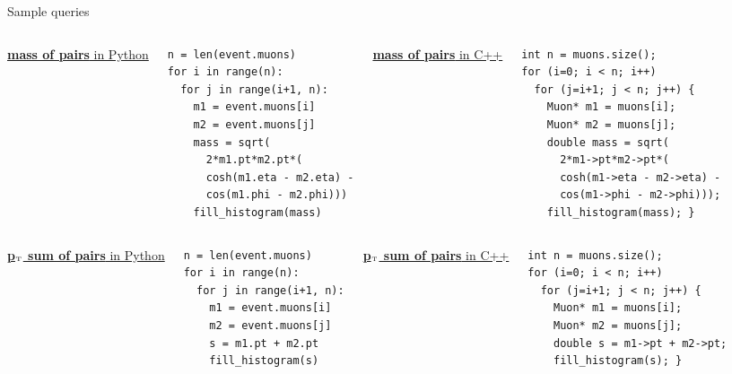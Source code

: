 \documentclass{beamer}
\begin{document}
\begin{frame}[fragile]{Sample queries}
\vspace{0.5 cm}
\scriptsize

\begin{columns}
\underline{{\bf mass of pairs} in Python}
\begin{verbatim}
n = len(event.muons)
for i in range(n):
  for j in range(i+1, n):
    m1 = event.muons[i]
    m2 = event.muons[j]
    mass = sqrt(
      2*m1.pt*m2.pt*(
      cosh(m1.eta - m2.eta) -
      cos(m1.phi - m2.phi)))
    fill_histogram(mass)
\end{verbatim}
\underline{{\bf mass of pairs} in C++}
\begin{verbatim}
int n = muons.size();
for (i=0; i < n; i++)
  for (j=i+1; j < n; j++) {
    Muon* m1 = muons[i];
    Muon* m2 = muons[j];
    double mass = sqrt(
      2*m1->pt*m2->pt*(
      cosh(m1->eta - m2->eta) -
      cos(m1->phi - m2->phi)));
    fill_histogram(mass); }
\end{verbatim}
\end{columns}

\vfill
\begin{columns}
\underline{{\bf p$_{\mbox{\tiny T}}$ sum of pairs} in Python}
\begin{verbatim}
n = len(event.muons)
for i in range(n):
  for j in range(i+1, n):
    m1 = event.muons[i]
    m2 = event.muons[j]
    s = m1.pt + m2.pt
    fill_histogram(s)
\end{verbatim}
\underline{{\bf p$_{\mbox{\tiny T}}$ sum of pairs} in C++}
\begin{verbatim}
int n = muons.size();
for (i=0; i < n; i++)
  for (j=i+1; j < n; j++) {
    Muon* m1 = muons[i];
    Muon* m2 = muons[j];
    double s = m1->pt + m2->pt;
    fill_histogram(s); }
\end{verbatim}
\end{columns}
\end{frame}




\end{document}
